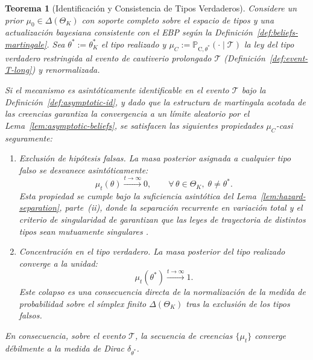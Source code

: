 \documentclass[pdflatex,sn-mathphys-ay]{sn-jnl}
\theoremstyle{thmstyleone}
\newtheorem{theorem}{Teorema}
\theoremstyle{thmstyletwo}
\theoremstyle{thmstylethree}
\newcommand{\ProbC}[1]{\mathbb{P}_{\mathrm{C},#1}}
\newcommand{\ThetaK}{\Theta_K}
\newcommand{\1}{\mathbf{1}}
\begin{document}
\begin{theorem}[Identificación y Consistencia de Tipos Verdaderos]\label{thm:posterior-consistency}
\normalfont
Considere un prior $\mu_0\in\Delta(\ThetaK)$ con soporte completo sobre el espacio de tipos y una actualización bayesiana consistente con el EBP según la Definición~\ref{def:beliefs-martingale}. Sea $\theta^\ast:=\theta_K^\ast$ el tipo realizado y $\mu_C:=\ProbC{\theta^\ast}(\cdot\mid\mathcal{T})$ la ley del tipo verdadero restringida al evento de cautiverio prolongado $\mathcal{T}$ \textup{(}Definición~\ref{def:event-T-long}\textup{)} y renormalizada.

Si el mecanismo es asintóticamente identificable en el evento $\mathcal{T}$ bajo la Definición~\ref{def:asymptotic-id}, y dado que la estructura de martingala acotada de las creencias garantiza la convergencia a un límite aleatorio por el Lema~\ref{lem:asymptotic-beliefs}, se satisfacen las siguientes propiedades $\mu_C$-casi seguramente:
\begin{enumerate}
  \item Exclusión de hipótesis falsas. La masa posterior asignada a cualquier tipo falso se desvanece asintóticamente:
  \begin{equation*}
  \mu_t(\theta)\xrightarrow{t\to\infty}0,\qquad \forall\,\theta\in\ThetaK,\;\theta\neq\theta^\ast.
  \end{equation*}
  Esta propiedad se cumple bajo la suficiencia asintótica del Lema~\ref{lem:hazard-separation}, parte~\textup{(ii)}, donde la separación recurrente en variación total y el criterio de singularidad de \citet{Kakutani1948} garantizan que las leyes de trayectoria de distintos tipos sean mutuamente singulares \citet{Shiryaev2019Probability}.

  \item Concentración en el tipo verdadero. La masa posterior del tipo realizado converge a la unidad:
  \begin{equation*}
  \mu_t(\theta^\ast)\xrightarrow{t\to\infty}1.
  \end{equation*}
  Este colapso es una consecuencia directa de la normalización de la medida de probabilidad sobre el símplex finito $\Delta(\ThetaK)$ tras la exclusión de los tipos falsos.
\end{enumerate}
En consecuencia, sobre el evento $\mathcal{T}$, la secuencia de creencias $\{\mu_t\}$ converge débilmente a la medida de Dirac $\delta_{\theta^\ast}$.
\end{theorem}
\end{document}

